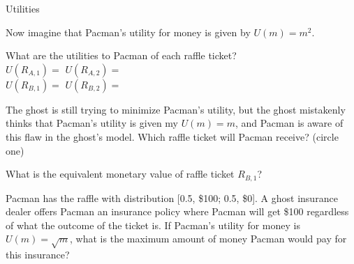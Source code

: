 \begin{problem}[12]{Utilities}
\begin{question}[5]{}
Now imagine that Pacman's utility for money is given by $U(m) = m^2$. 
\begin{subquestion}[2]
What are the utilities to Pacman of each raffle ticket?\\
\vspace{.2cm}
{\centering $U(R_{A, 1}) =$ \solution{}{\TwoBiUAOne} \hspace{6cm} $U(R_{A, 2}) =$ \solution{}{\TwoBiUATwo}}\\
\vspace{.2cm}
{\centering $U(R_{B, 1}) =$ \solution{}{\TwoBiUBOne} \hspace{6cm} $U(R_{B, 2}) =$ \solution{}{\TwoBiUBTwo}}\\
\end{subquestion}
\vspace{-0.5cm}
\begin{subquestion}[1]
The ghost is still trying to minimize Pacman's utility, but the ghost mistakenly thinks that Pacman's utility is given my $U(m) = m$, and Pacman is aware of this flaw in the ghost's model.  Which raffle ticket will Pacman receive? (circle one)\\
\TwoBii
\end{subquestion}
\begin{subquestion}[2]
What is the equivalent monetary value of raffle ticket $R_{B,1}$?\\
\end{subquestion}
\end{question}

\begin{question}[2]{}
Pacman has the raffle with distribution [0.5, \$100; 0.5, \$0]. A ghost insurance dealer offers Pacman an insurance policy where Pacman will get \$100 regardless of what the outcome of the ticket is. If Pacman's utility for money is $U(m) = \sqrt{m}$, what is the maximum amount of money Pacman would pay for this insurance? \\
\end{question}
\end{problem}
